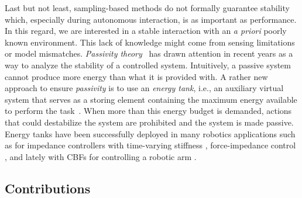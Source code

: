 Last but not least, sampling-based methods do not formally guarantee stability which, especially during autonomous interaction, is as important as performance. In this regard, we are interested in a stable interaction with an \emph{a priori} poorly known environment. This lack of knowledge might come from sensing limitations or model mismatches. \emph{Passivity theory}~\cite{willems1972dissipative} has drawn attention in recent years as a way to analyze the stability of a controlled system. Intuitively, a passive system cannot produce more energy than what it is provided with. A rather new approach to ensure \emph{passivity} is to use an \emph{energy tank}, i.e., an auxiliary virtual system that serves as a storing element containing the maximum energy available to perform the task~\cite{ferraguti2015energy}. When more than this energy budget is demanded, actions that could destabilize the system are prohibited and the system is made passive. Energy tanks have been successfully deployed in many robotics applications such as for impedance controllers with time-varying stiffness \cite{schindlbeck2015unified}, force-impedance control \cite{shahriari2018valve,2022-BenBruTogSecSie}, and lately with CBFs for controlling a robotic arm \cite{benzi2021optimization}.
 

\subsection{Contributions}

